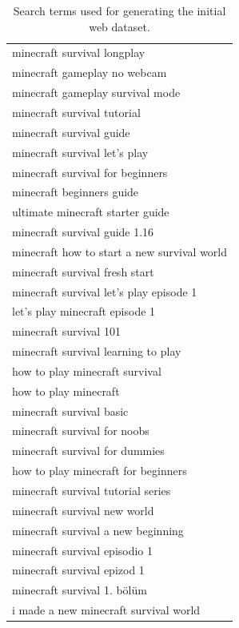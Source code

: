 \begin{table}[h]
\centering
\begin{center}
\begin{tabular}{ |l|}
\hline
minecraft survival longplay \\
minecraft gameplay no webcam \\
minecraft gameplay survival mode \\
minecraft survival tutorial \\
minecraft survival guide \\
minecraft survival let's play \\
minecraft survival for beginners \\
minecraft beginners guide \\
ultimate minecraft starter guide \\
minecraft survival guide 1.16 \\
minecraft how to start a new survival world \\
minecraft survival fresh start \\
minecraft survival let's play episode 1 \\
let's play minecraft episode 1 \\
minecraft survival 101 \\
minecraft survival learning to play \\
how to play minecraft survival \\
how to play minecraft \\
minecraft survival basic \\
minecraft survival for noobs \\
minecraft survival for dummies \\
how to play minecraft for beginners \\
minecraft survival tutorial series \\
minecraft survival new world \\
minecraft survival a new beginning \\
minecraft survival episodio 1 \\
minecraft survival {\sffamily\foreignlanguage{russian}{epizod}} 1 \\
minecraft survival 1. bölüm \\
i made a new minecraft survival world \\
\hline
\end{tabular}
\end{center}
\caption{\label{tab:query_strings}Search terms used for generating the initial web dataset.}
\end{table}

